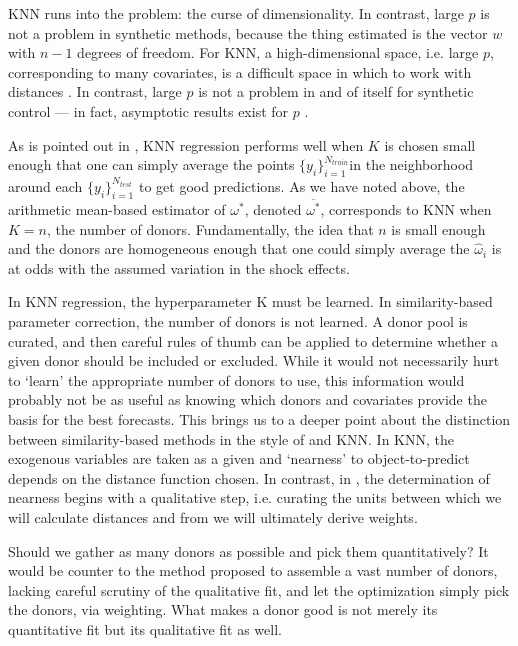 \documentclass[11pt]{article}
\theoremstyle{definition}
\begin{document}
KNN runs into the problem: the curse of dimensionality.  In contrast, large $p$ is not a problem in synthetic methods, because the thing estimated is the vector $w$ with $n-1$ degrees of freedom.  For KNN, a high-dimensional space, i.e. large $p$, corresponding to many covariates, is a difficult space in which to work with distances \citep{hastie2009elements}.  In contrast, large $p$ is not a problem in and of itself for synthetic control --- in fact, asymptotic results exist for $p$ \citep{abadie2010synthetic}.  

As is pointed out in \citet{hastie2009elements}, KNN regression performs well when $K$ is chosen small enough that one can simply average the points $\{y_{i}\}_{i=1}^{N_{train}}$in the neighborhood around each $\{y_{i}\}_{i=1}^{N_{test}}$ to get good predictions.  As we have noted above, the arithmetic mean-based estimator of $\omega^{*}$, denoted $\overline{\omega^{*}}$, corresponds to KNN when $K = n$, the number of donors.  Fundamentally, the idea that $n$ is small enough and the donors are homogeneous enough that one could simply average the $\hat\omega_{i}$ is at odds with the assumed variation in the shock effects.

In KNN regression, the hyperparameter K must be learned.  In similarity-based parameter correction, the number of donors is not learned.  A donor pool is curated, and then careful rules of thumb can be applied to determine whether a given donor should be included or excluded.  While it would not necessarily hurt to `learn' the appropriate number of donors to use, this information would probably not be as useful as knowing which donors and covariates provide the basis for the best forecasts.  This brings us to a deeper point about the distinction between similarity-based methods in the style of \citet{lin2021minimizing} and KNN.  In KNN, the exogenous variables are taken as a given and `nearness' to object-to-predict depends on the distance function chosen.  In contrast, in \citet{lin2021minimizing}, the determination of nearness begins with a qualitative step, i.e. curating the units between which we will calculate distances and from we will ultimately derive weights.

Should we gather as many donors as possible and pick them quantitatively?  It would be counter to the method proposed to assemble a vast number of donors, lacking careful scrutiny of the qualitative fit, and let the optimization simply pick the donors, via weighting.  What makes a donor good is not merely its quantitative fit but its qualitative fit as well.
\end{document}
